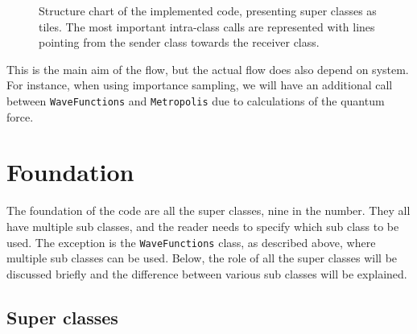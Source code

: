 \begin{figure} [h]
	\label{fig:structurechart1}
	\caption{Structure chart of the implemented code, presenting super classes as tiles. The most important intra-class calls are represented with lines pointing from the sender class towards the receiver class.}
\end{figure}

This is the main aim of the flow, but the actual flow does also depend on system. For instance, when using importance sampling, we will have an additional call between \texttt{WaveFunctions} and \texttt{Metropolis} due to calculations of the quantum force. 

\section{Foundation} \label{subsec:foundation}
The foundation of the code are all the super classes, nine in the number. They all have multiple sub classes, and the reader needs to specify which sub class to be used. The exception is the \texttt{WaveFunctions} class, as described above, where multiple sub classes can be used. Below, the role of all the super classes will be discussed briefly and the difference between various sub classes will be explained. 

\subsection{Super classes}

